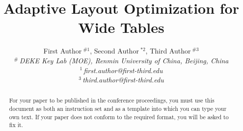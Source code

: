 \documentclass[10pt,conference,letterpaper]{IEEEtran}
\title{Adaptive Layout Optimization for Wide Tables}
\author{%
{First Author{\small $~^{\#1}$}, Second Author{\small $~^{*2}$}, Third Author{\small $~^{\#3}$} }%
\vspace{1.6mm}\\
\fontsize{10}{10}\selectfont\itshape
$^{\#}$\,DEKE Key Lab (MOE), Renmin University of China, Beijing, China\\
\fontsize{9}{9}\selectfont\ttfamily\upshape
%
$^{1}$\,first.author@first-third.edu\\
$^{3}$\,third.author@first-third.edu%
}
\begin{document}
\maketitle
%
\begin{abstract} 
For your paper to be published in the conference proceedings, you must
use this document as both an instruction set and as a template into
which you can type your own text.  If your paper does not conform to
the required format, you will be asked to fix it.
\end{abstract}


%





















\end{document}
